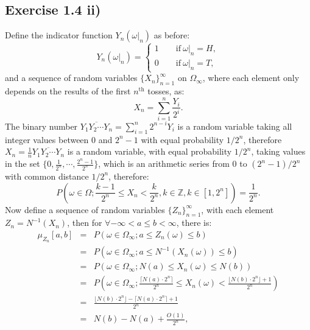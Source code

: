 \documentclass[final,3p,authoryear]{elsarticle}
\begin{document}
	\subsection{Exercise 1.4 ii)}
		Define the indicator function $Y_n(\omega|_n)$ as before:
		\begin{equation}
			Y_n(\omega|_n)=
			\begin{cases}
				1\qquad \mathrm{if~} \omega|_n=H,\\
				0\qquad \mathrm{if~} \omega|_n=T,
			\end{cases}
		\end{equation}
		and a sequence of random variables $\{X_n\}_{n=1}^{\infty}$ on $\Omega_\infty$, where each element only depends on the results of the first $n^\mathrm{th}$ tosses, as:
		\begin{equation}
			X_n=\sum\limits_{i=1}^{n} \frac{Y_i}{2^i}
			.
		\end{equation}
		The binary number $\overline{Y_1 Y_2 \cdots Y_n}=\sum\limits_{i=1}^{n} 2^{n-i} Y_i$ is a random variable taking all integer values between $0$ and $2^n-1$ with equal probability $1/2^n$, therefore $X_n=\frac{1}{n} \overline{Y_1 Y_2 \cdots Y_n}$ is a random variable, with equal probability $1/2^n$, taking values in the set $\{0, \frac{1}{2^n}, \cdots, \frac{2^n-1}{2^n}\}$, which is an arithmetic series from $0$ to $(2^n-1)/2^n$ with common distance $1/2^n$, therefore:
		\begin{equation}
			P(\omega \in \Omega; \frac{k-1}{2^n} \leq X_n < \frac{k}{2^n}, k \in \mathbb{Z},k \in [1,2^n]) = \frac{1}{2^n}
			.
		\end{equation}
		Now define a sequence of random variables $\{Z_n\}_{n=1}^{\infty}$, with each element $Z_n = N^{-1}(X_n)$, then for $\forall -\infty < a \leq b < \infty$, there is:
		\begin{eqnarray}
			\mu_{Z_n}[a,b]&=&P(\omega \in \Omega_\infty; a \leq Z_n(\omega) \leq b)
			\nonumber\\
			&=&P(\omega \in \Omega_\infty; a \leq N^{-1}(X_n(\omega)) \leq b)
			\nonumber\\
			&=&P(\omega \in \Omega_\infty; N(a) \leq X_n(\omega) \leq N(b))
			\nonumber\\
			&=&P(\omega \in \Omega_\infty; \frac{\lceil N(a)\cdot 2^n \rceil}{2^n} \leq X_n(\omega) < \frac{\lfloor N(b)\cdot 2^n \rfloor + 1}{2^n})
			\nonumber\\
			&=& \frac{\lfloor N(b)\cdot 2^n \rfloor - \lceil N(a)\cdot 2^n \rceil + 1}{2^n}
			\nonumber\\
			&=&N(b)-N(a) + \frac{O(1)}{2^n}
			,
		\end{eqnarray}
\end{document}
